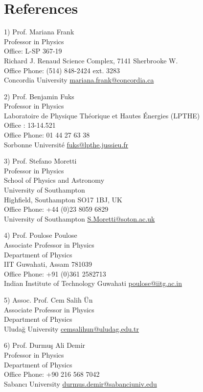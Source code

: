 \documentclass[]{friggeri-cv}
\begin{document}
\section{References}
	
	\begin{entrylist}
		
		\entry
		{1)}
		{Prof. Mariana Frank \\ \normalfont
		Professor in Physics \\
		Office: 	L-SP 367-19 \\
		Richard J. Renaud Science Complex, 7141 Sherbrooke W. 	\\
		Office Phone: 	(514) 848-2424 ext. 3283 \\
		Concordia University}
		{\href{mariana.frank@concordia.ca}{mariana.frank@concordia.ca}} 
		

			
		\entry
		{2)}
		{Prof. Benjamin Fuks \\ \normalfont
		Professor in Physics \\	
		Laboratoire de Physique Théorique et Hautes Énergies (LPTHE) \\	
		Office : 	13-14.521 \\
		Office Phone: 	01 44 27 63 38	\\
		Sorbonne Université}
		{\href{fuks@lpthe.jussieu.fr}{fuks@lpthe.jussieu.fr}} 		
	
	    \entry
		{3)}
		{Prof. Stefano Moretti  \\ \normalfont
		Professor in Physics \\	
		School of Physics and Astronomy \\
		University of Southampton \\
		Highfield, Southampton SO17 1BJ, UK	\\
		Office Phone: 	+44 (0)23 8059 6829 \\
		University of Southampton}
		{\href{S.Moretti@soton.ac.uk}{S.Moretti@soton.ac.uk}} 			
	
		\entry
		{4)}
		{Prof. Poulose Poulose \\ \normalfont
		Associate Professor in Physics \\		
		Department of Physics \\
		IIT Guwahati, Assam 781039 \\
		Office Phone: +91 (0)361 2582713 \\			
		Indian Institute of Technology Guwahati}
		{\href{poulose@iitg.ac.in}{poulose@iitg.ac.in}} 					

	
	    \entry
		{5)}
		{Assoc. Prof. Cem Salih Ün  \\ \normalfont
		Associate Professor in Physics \\		
		Department of Physics \\			
		Uludağ University}
		{\href{cemsalihun@uludag.edu.tr}{cemsalihun@uludag.edu.tr}} 		

	    \entry
		{6)}
		{Prof. Durmuş Ali Demir  \\ \normalfont
		Professor in Physics \\		
		Department of Physics \\
	    Office Phone: +90 216 568 7042 \\						
		Sabancı University}
		{\href{durmus.demir@sabanciuniv.edu}{durmus.demir@sabanciuniv.edu}} 		


	\end{entrylist}
\end{document}
